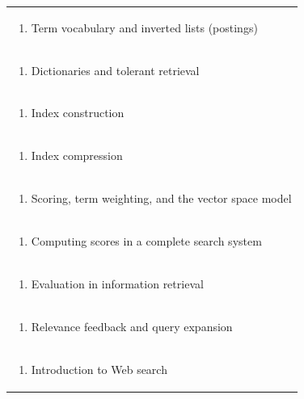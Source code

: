 \documentclass[11pt]{article}
\begin{document}
\begin{center}
\begin{longtable}{|p{4cm}|p{4cm}|p{4cm}|p{4cm}|}
\multicolumn{4}{|p{\dimexpr 16cm + 6\tabcolsep\relax}|}{\begin{enumerate}[start=3]\item Term vocabulary and inverted lists (postings)\end{enumerate}}\\
\multicolumn{4}{|p{\dimexpr 16cm + 6\tabcolsep\relax}|}{\begin{enumerate}[start=4]\item Dictionaries and tolerant retrieval\end{enumerate}}\\
\multicolumn{4}{|p{\dimexpr 16cm + 6\tabcolsep\relax}|}{\begin{enumerate}[start=5]\item Index construction\end{enumerate}}\\
\multicolumn{4}{|p{\dimexpr 16cm + 6\tabcolsep\relax}|}{\begin{enumerate}[start=6]\item Index compression\end{enumerate}}\\
\multicolumn{4}{|p{\dimexpr 16cm + 6\tabcolsep\relax}|}{\begin{enumerate}[start=7]\item Scoring, term weighting, and the vector space model\end{enumerate}}\\
\multicolumn{4}{|p{\dimexpr 16cm + 6\tabcolsep\relax}|}{\begin{enumerate}[start=8]\item Computing scores in a complete search system\end{enumerate}}\\
\multicolumn{4}{|p{\dimexpr 16cm + 6\tabcolsep\relax}|}{\begin{enumerate}[start=9]\item Evaluation in information retrieval\end{enumerate}}\\
\multicolumn{4}{|p{\dimexpr 16cm + 6\tabcolsep\relax}|}{\begin{enumerate}[start=10]\item Relevance feedback and query expansion\end{enumerate}}\\
\multicolumn{4}{|p{\dimexpr 16cm + 6\tabcolsep\relax}|}{\begin{enumerate}[start=11]\item Introduction to Web search\end{enumerate}}\\

\end{longtable}
\end{center}
\end{document}

